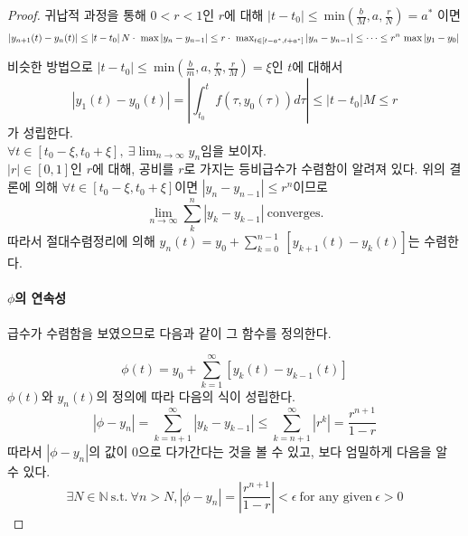 \documentclass[a4paper,10pt]{article}
\begin{document}
\begin{proof}
    귀납적 과정을 통해 $0 < r < 1$인 $r$에 대해 $|t - t_0| \leq \ \text{min}\left( \frac{b}{M}, a, \frac{r}{N} \right) = a^*$ 이면
       \begin{displaymath}
        \left| y_{n+1}(t) - y_n(t) \right| \leq \left| t - t_0 \right|N \cdot \ \text{max}\left| y_n - y_{n-1} \right| \leq r \cdot \ \text{max}_{t \in [t - a^*, t + a^*]}\left| y_n - y_{n-1} \right| \leq \cdots \leq r^n \ \text{max}\left| y_1 - y_0 \right|\\
    \end{displaymath} 
    
    
    비슷한 방법으로 $|t - t_0| \leq \ \text{min}\left( \frac{b}{m}, a, \frac{r}{N}, \frac{r}{M}\right) = \xi$인 $t$에 대해서
    \begin{displaymath}
        \left| y_{1}(t) - y_0(t) \right| = \left| \int_{t_0}^t f(\tau, y_0(\tau))d \tau \right| \leq |t-t_0| M \leq r
    \end{displaymath}
    가 성립한다.
    \\
    
    
    $\displaystyle{\forall t \in [t_0 - \xi, t_0 + \xi], \ \exists \lim_{n \to \infty} y_n}$임을 보이자.\\
    
    $|r| \in [0,1]$인 $r$에 대해, 공비를 $r$로 가지는 등비급수가 수렴함이 알려져 있다. 위의 결론에 의해 $\displaystyle{\forall t \in [t_0 - \xi, t_0 + \xi]}$이면 $\displaystyle{|y_n - y_{n-1}| \leq r^{n}}$이므로 \begin{displaymath}
        \lim_{n \to \infty} \sum_{k}^{n} \left| y_k - y_{k-1} \right| \ \text{converges.}
    \end{displaymath}
    따라서 절대수렴정리에 의해 $\displaystyle{y_n(t) = y_0 + \sum_{k = 0}^{n-1} \ \left[y_{k+1}(t) - y_k(t)\right]}$는 수렴한다.\\
    
    \paragraph{$\phi$의 연속성}
    급수가 수렴함을 보였으므로 다음과 같이 그 함수를 정의한다.
    
    \begin{displaymath}
        \phi(t) = y_0 + \sum_{k = 1}^{\infty}[y_k(t) - y_{k-1}(t)]
    \end{displaymath}
    $\phi(t)$와 $y_n(t)$의 정의에 따라 다음의 식이 성립한다.
    \begin{displaymath}
        \left| \phi - y_n \right| = \sum_{k = n+1}^\infty \left| y_k - y_{k-1} \right| \leq \sum_{k = n+1}^\infty \left| r^k \right| = \frac{r^{n+1}}{1-r}
    \end{displaymath}
    따라서 $|\phi - y_n|$의 값이 0으로 다가간다는 것을 볼 수 있고, 보다 엄밀하게 다음을 알 수 있다.
    \begin{equation}
      \exists N \in \mathbb{N} \ \text{s.t.} \ \forall n > N, |\phi - y_n| = \left| \frac{r^{n+1}}{1-r} \right| < \epsilon \ \text{for any given} \ \epsilon > 0 \tag{\ast} \label{flooreq}
    \end{equation}
    

\end{proof}
\end{document}
